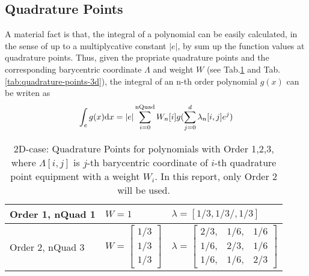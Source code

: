 \subsection{Quadrature Points}
A material fact is that, the integral of a polynomial can be easily calculated, 
in the sense of up to a multiplycative constant $|e|$,
by sum up the function values at quadrature points\cite{chen2008ifem}.
Thus, given the propriate quadrature points and the corresponding 
barycentric coordinate $\Lambda$ and weight $W$
(see Tab.\ref{tab:quadrature-points-2d} and Tab.\ref{tab:quadrature-points-3d}),
the integral of an n-th order polynomial $g(x)$ can be writen as 
\begin{equation}\label{eq:quadrature-points-integral}
  \int_e g(x)\mathrm{d} x=|e|\sum_{i=0}^{\text{nQuad}}W_n[i]g(\sum_{j=0}^{d}\lambda_n[i,j]e^j)
\end{equation}
\begin{table}[ht]
  \centering
  \caption{2D-case: Quadrature Points for polynomials with Order 1,2,3, 
  where $\Lambda[i,j]$ is $j$-th barycentric coordinate of $i$-th quadrature point equipment with a weight $W_i$. 
  In this report, only Order 2 will be used.}
  \label{tab:quadrature-points-2d}
  \begin{tabular}{l|l|l}
    \hline
    Order 1, nQuad 1
    & $W=1$
    & $\lambda=[1/3,1/3/,1/3]$ \\
    \hline
    Order 2, nQuad 3 
    & $W=\left[
      \begin{array}{c}
        1/3 \\
        1/3 \\
        1/3
      \end{array}\right]$
    & $\lambda=\left[
      \begin{array}{ccc}
        2/3, & 1/6, & 1/6 \\
        1/6, & 2/3, & 1/6 \\
        1/6, & 1/6, & 2/3
      \end{array}
      \right]$ \\
    \hline
  \end{tabular}
\end{table}

